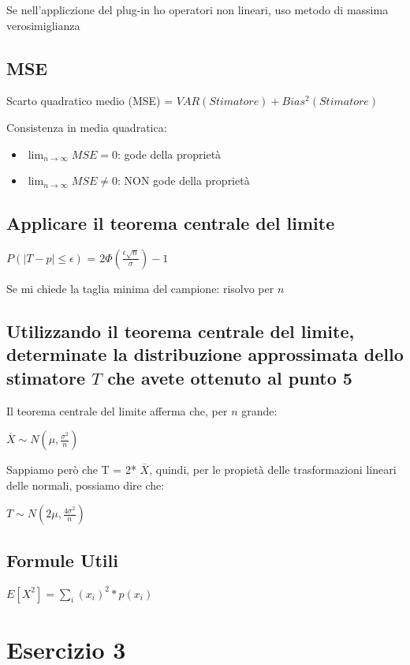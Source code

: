 \documentclass{article}
\begin{document}
Se nell'appliczione del plug-in ho operatori non lineari, uso metodo di massima verosimiglianza

\subsection*{MSE}

Scarto quadratico medio (MSE) = $VAR(Stimatore) + Bias^2(Stimatore)$

Consistenza in media quadratica:

\begin{itemize}
    \item $\lim_{n \to \infty}MSE = 0$: gode della proprietà
    \item $\lim_{n \to \infty}MSE \neq 0$: NON gode della proprietà
\end{itemize}

\subsection*{Applicare il teorema centrale del limite}

$P(|T - p| \leq \epsilon)$ = $2\Phi(\frac{\epsilon\sqrt{n}}{\sigma}) - 1$

Se mi chiede la taglia minima del campione: risolvo per $n$

\subsection*{Utilizzando il teorema centrale del limite, determinate la distribuzione approssimata dello stimatore $T$ che avete ottenuto al punto 5}

Il teorema centrale del limite afferma che, per $n$ grande:

$\overline{X} \sim N(\mu, \frac{\sigma^2}{n})$

Sappiamo però che T = 2* $\overline{X}$, quindi, per le propietà delle trasformazioni lineari delle normali, possiamo dire che:

$T \sim N (2 \mu, \frac{4 \sigma^2}{n})$

\subsection*{Formule Utili}

$E[X^2] = \sum_{i}(x_i)^2*p(x_i)$

\pagebreak

\section{Esercizio 3}
\end{document}
